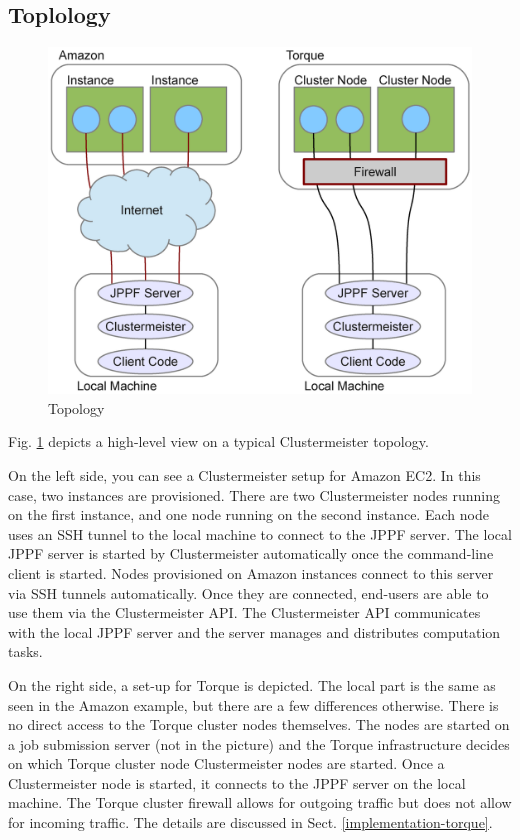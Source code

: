 \documentclass[english]{uzhpub}
\begin{document}
\subsection{Toplology}
\label{topology}

\begin{figure}[h]
\centering
\includegraphics[scale=0.5]{images/topology.pdf}
\caption{Topology}
\label{fig:topology}
\end{figure}

Fig. \ref{fig:topology} depicts a high-level view on a typical Clustermeister topology.

On the left side, you can see a Clustermeister setup for Amazon EC2. In this case, two instances are provisioned. There are two Clustermeister nodes running on the first instance, and one node running on the second instance. Each node uses an SSH tunnel to the local machine to connect to the JPPF server. The local JPPF server is started by Clustermeister automatically once the command-line client is started. Nodes provisioned on Amazon instances connect to this server via SSH tunnels automatically. Once they are connected, end-users are able to use them via the Clustermeister API. The Clustermeister API communicates with the local JPPF server and the server manages and distributes computation tasks.

On the right side, a set-up for Torque is depicted. The local part is the same as seen in the Amazon example, but there are a few differences otherwise. There is no direct access to the Torque cluster nodes themselves. The nodes are started on a job submission server (not in the picture) and the Torque infrastructure decides on which Torque cluster node Clustermeister nodes are started. Once a Clustermeister node is started, it connects to the JPPF server on the local machine. The Torque cluster firewall allows for outgoing traffic but does not allow for incoming traffic. The details are discussed in Sect. \ref{implementation-torque}.
\end{document}

